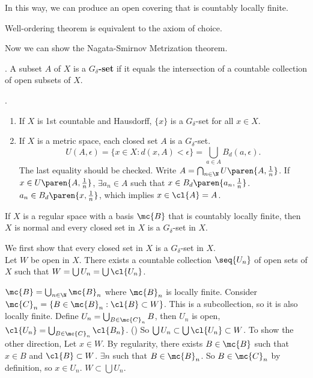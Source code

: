 In this way, we can produce an open covering that is countably locally finite.

\rmk Well-ordering theorem is equivalent to the axiom of choice.

Now we can show the Nagata-Smirnov Metrization theorem.


.  A subset \(A\) of \(X\) is a \textbf{\(G_\delta\)-set} if it equals the intersection of a countable collection of open subsets of \(X\).

\ex.
\begin{enumerate}
    \item If \(X\) is 1st countable and Hausdorff, \(\{x\}\) is a \(G_\delta\)-set for all \(x \in X\).
    \item If \(X\) is a metric space, each closed set \(A\) is a \(G_\delta\)-set.
    \[
        U(A, \epsilon) = \{x \in X : d(x, A) < \epsilon\} = \bigcup_{a \in A} B_d(a, \epsilon).
    \]
    The last equality should be checked. Write \(A = \bigcap_{n \in \N} U\paren{A, \frac{1}{n}}\). If \(x \in U\paren{A, \frac{1}{n}}\), \(\exists a_n \in A\) such that \(x \in B_d\paren{a_n, \frac{1}{n}}\). \(a_n \in B_d\paren{x, \frac{1}{n}}\), which implies \(x \in \cl{A} = A\).
\end{enumerate}

 If \(X\) is a regular space with a basis \(\mc{B}\) that is countably locally finite, then \(X\) is normal and every closed set in \(X\) is a \(G_\delta\)-set in \(X\).

\pf We first show that every closed set in \(X\) is a \(G_\delta\)-set in \(X\). \\
 Let \(W\) be open in \(X\). There exists a countable collection \(\seq{U_n}\) of open sets of \(X\) such that \(W = \bigcup U_n = \bigcup \cl{U_n}\).

\(\mc{B} = \bigcup_{n \in \N} \mc{B}_n\) where \(\mc{B}_n\) is locally finite. Consider \(\mc{C}_n = \{B \in \mc{B}_n : \cl{B} \subset W\}\). This is a subcollection, so it is also locally finite. Define \(U_n = \bigcup_{B \in \mc{C}_n} B\), then \(U_n\) is open, \(\cl{U_n} = \bigcup_{B \in \mc{C}_n} \cl{B_n}\). () So \(\bigcup U_n \subset \bigcup \cl{U_n} \subset W\). To show the other direction, Let \(x \in W\). By regularity, there exists \(B \in \mc{B}\) such that \(x \in B\) and \(\cl{B} \subset W\). \(\exists n\) such that \(B \in \mc{B}_n\). So \(B \in \mc{C}_n\) by definition, so \(x \in U_n\). \(W \subset \bigcup U_n\).


